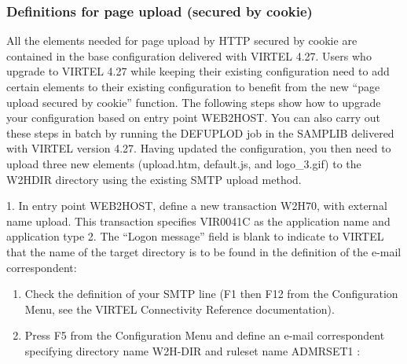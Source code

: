 \documentclass[letterpaper,10pt,english]{sphinxmanual}
\begin{document}
\subsubsection{Definitions for page upload (secured by cookie)}
\label{\detokenize{audit_operations_ and_performance:definitions-for-page-upload-secured-by-cookie}}
All the elements needed for page upload by HTTP secured by cookie are contained in the base configuration delivered
with VIRTEL 4.27. Users who upgrade to VIRTEL 4.27 while keeping their existing configuration need to add certain
elements to their existing configuration to benefit from the new “page upload secured by cookie” function.
The following steps show how to upgrade your configuration based on entry point WEB2HOST. You can also carry out
these steps in batch by running the DEFUPLOD job in the SAMPLIB delivered with VIRTEL version 4.27. Having updated
the configuration, you then need to upload three new elements (upload.htm, default.js, and logo\_3.gif) to the W2HDIR
directory using the existing SMTP upload method.

1. In entry point WEB2HOST, define a new transaction W2H\textendash{}70, with external name upload. This transaction specifies
VIR0041C as the application name and application type 2. The “Logon message” field is blank to indicate to VIRTEL
that the name of the target directory is to be found in the definition of the e-mail correspondent:


\begin{enumerate}
\def\theenumi{\arabic{enumi}}
\def\labelenumi{\theenumi .}
\makeatletter\def\p@enumii{\p@enumi \theenumi .}\makeatother
\setcounter{enumi}{1}
\item {} 
Check the definition of your SMTP line (F1 then F12 from the Configuration Menu, see the VIRTEL Connectivity Reference documentation).

\item {} 
Press F5 from the Configuration Menu and define an e-mail correspondent specifying directory name W2H-DIR and ruleset name ADMRSET1 :

\end{enumerate}
\end{document}

